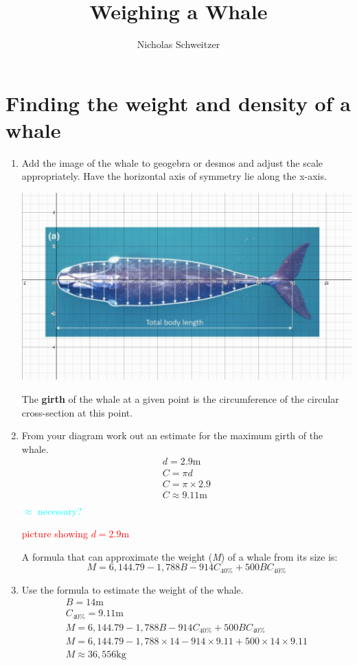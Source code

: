 \documentclass[fleqn]{article}
\title{\Huge Weighing a Whale}
\author{Nicholas Schweitzer}
\date{}
\newcommand{\unit}[1]{\ensuremath{\mathrm{#1}}}
\newcommand\todo[1]{\textcolor{red}{#1}}
\newcommand\ask[1]{\textcolor{cyan}{#1}}
\begin{document}
\maketitle

\section{Finding the weight and density of a whale}

\begin{enumerate}
  \item Add the image of the whale to geogebra or desmos and adjust the scale appropriately. Have the horizontal axis of symmetry lie along the x-axis.

  \includegraphics[scale=0.35]{desmos-whale.png}

  The \textbf{girth} of the whale at a given point is the circumference of the circular cross-section at this point.

  \item From your diagram work out an estimate for the maximum girth of the whale.
  \begin{gather*}
    d = 2.9\unit{m} \\
    C = \pi d \\
    C = \pi \times 2.9 \\
    C \approx 9.11\unit{m} \\
  \end{gather*}
  \ask{$\approx$ necessary?}

  \todo{picture showing $d=2.9\unit{m}$}

  A formula that can approximate the weight (\textit{M}) of a whale from its size is:
  \[
  M = 6,144.79 - 1,788B - 914C_{40\%}+500BC_{40\%}
  \]

  \item Use the formula to estimate the weight of the whale.
  \begin{gather*}
    B = 14\unit{m} \\
    C_{40\%} = 9.11\unit{m} \\
    M = 6,144.79 - 1,788B - 914C_{40\%}+500BC_{40\%} \\
    M = 6,144.79 - 1,788 \times 14 - 914 \times 9.11 + 500 \times 14 \times 9.11 \\
    M \approx 36,556 \unit{kg}
  \end{gather*}


\end{enumerate}
\end{document}
